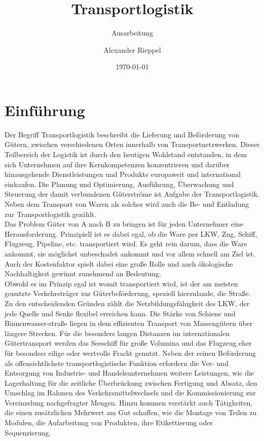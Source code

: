 \documentclass[a4paper,12pt]{scrreprt}
\begin{document}
\author{Alexander Rieppel} %
\title{Transportlogistik} %
\subject{Betriebs- und Informationsmanagement} %
\subtitle{Ausarbeitung} %
\date{\today} %
\publishers{5AHITT} %
{\Huge }

\maketitle
\tableofcontents


\chapter{Einführung}
	Der Begriff Transportlogistik beschreibt die Lieferung und Beförderung von Gütern, zwischen verschiedenen Orten innerhalb von Transportnetzwerken. Dieser Teilbereich der Logistik ist durch den heutigen Wohlstand entstanden, in dem sich Unternehmen auf ihre Kernkompetenzen konzentrieren und darüber hinausgehende Dienstleistungen und Produkte europaweit und international einkaufen. Die Planung und Optimierung, Ausführung, Überwachung und Steuerung der damit verbundenen Güterströme ist Aufgabe der Transportlogistik. Neben dem Transport von Waren als solches wird auch die Be- und Entladung zur Transportlogistik gezählt.\\
	
	Das Problem Güter von A nach B zu bringen ist für jeden Unternehmer eine Herausforderung. Prinzipiell ist es dabei egal, ob die Ware per LKW, Zug, Schiff, Flugzeug, Pipeline, etc. transportiert wird. Es geht rein darum, dass die Ware ankommt, sie möglichst unbeschadet ankommt und vor allem schnell am Ziel ist. Auch der Kostenfaktor spielt dabei eine große Rolle und auch ökologische Nachhaltigkeit gewinnt zunehmend an Bedeutung.\\
	
	Obwohl es im Prinzip egal ist womit transportiert wird, ist der am meisten genutzte Verkehrsträger zur Güterbeförderung, speziell hierzulande, die Straße. Zu den entscheidenden Gründen zählt die Netzbildungsfähigkeit des LKW, der jede Quelle und Senke flexibel erreichen kann. Die Stärke von Schiene und Binnenwasser-straße liegen in dem effizienten Transport von Massengütern über längere Strecken. Für die besonders langen Distanzen im internationalen Gütertransport werden das Seeschiff für große Volumina und das Flugzeug eher für besonders eilige oder wertvolle Fracht genutzt. Neben der reinen Beförderung als offensichtlichste transportlogistische Funktion erfordern die Ver- und Entsorgung von Industrie- und Handelsunternehmen weitere Leistungen, wie die Lagerhaltung für die zeitliche Überbrückung zwischen Fertigung und Absatz, den Umschlag im Rahmen des Verkehrsmittelwechsels und die Kommissionierung zur Vereinzelung nachgefragter Mengen. Hinzu kommen verstärkt auch Tätigkeiten, die einen zusätzlichen Mehrwert am Gut schaffen, wie die Montage von Teilen zu Modulen, die Aufarbeitung von Produkten, ihre Etikettierung oder Sequenzierung.\\
	
\end{document}
